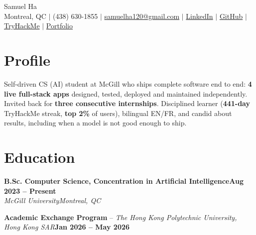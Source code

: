 \documentclass[letterpaper,9pt]{extarticle}
\newcommand{\entry}[4]{%
  \vspace{1.5pt}\noindent\textbf{#1}\hfill\textbf{#2}\\[-1pt]
  \noindent\textit{#3}\hfill\textit{#4}\par\vspace{-1pt}}
\begin{document}
\fontsize{9.5}{11.3}\selectfont

\begin{center}
  {\sffamily\fontsize{22}{24}\selectfont Samuel Ha}\\[3pt]
  {\sffamily\small
  Montreal, QC $|$ (438) 630-1855 $|$
  \href{mailto:samuelha120@gmail.com}{samuelha120@gmail.com} $|$
  \href{https://www.linkedin.com/in/samuel-ha-551644322/}{LinkedIn} $|$
  \href{https://github.com/SMLG120}{GitHub} $|$
  \href{https://tryhackme.com/p/smlg120}{TryHackMe} $|$
  \href{https://samuel-ha-portfolio.onrender.com}{Portfolio}}
\end{center}
\vspace{-7pt}

\section{Profile}
Self-driven CS (AI) student at McGill who ships complete software end to end: \textbf{4 live full-stack apps} designed, tested, deployed and maintained independently.
Invited back for \textbf{three consecutive internships}. Disciplined learner (\textbf{441-day} TryHackMe streak, \textbf{top 2\%} of users), bilingual EN/FR, and candid about results, including when a model is not good enough to ship.

\section{Education}
\entry{B.Sc. Computer Science, Concentration in Artificial Intelligence}{Aug 2023 -- Present}{McGill University}{Montreal, QC}
\vspace{1.5pt}\noindent\textbf{Academic Exchange Program} -- \textit{The Hong Kong Polytechnic University, Hong Kong SAR}\hfill\textbf{Jan 2026 -- May 2026}\par
\end{document}
